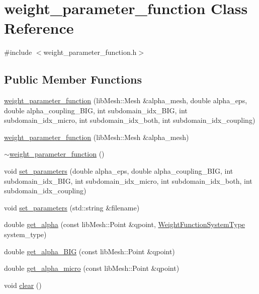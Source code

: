 \hypertarget{classweight__parameter__function}{}\section{weight\+\_\+parameter\+\_\+function Class Reference}
\label{classweight__parameter__function}


{\ttfamily \#include $<$weight\+\_\+parameter\+\_\+function.\+h$>$}

\subsection*{Public Member Functions}
\begin{DoxyCompactItemize}
\item 
\hyperlink{classweight__parameter__function_ae7dc955ca3080fc45818db02d57798ad}{weight\+\_\+parameter\+\_\+function} (lib\+Mesh\+::\+Mesh \&alpha\+\_\+mesh, double alpha\+\_\+eps, double alpha\+\_\+coupling\+\_\+\+B\+I\+G, int subdomain\+\_\+idx\+\_\+\+B\+I\+G, int subdomain\+\_\+idx\+\_\+micro, int subdomain\+\_\+idx\+\_\+both, int subdomain\+\_\+idx\+\_\+coupling)
\item 
\hyperlink{classweight__parameter__function_abf0209e5436906528b2ca90bcf9b025d}{weight\+\_\+parameter\+\_\+function} (lib\+Mesh\+::\+Mesh \&alpha\+\_\+mesh)
\item 
\hyperlink{classweight__parameter__function_a810022ef6bc2f4b5ca309f39c0eccce6}{$\sim$weight\+\_\+parameter\+\_\+function} ()
\item 
void \hyperlink{classweight__parameter__function_a63d24620e05e1a33a507986bac1a4c57}{set\+\_\+parameters} (double alpha\+\_\+eps, double alpha\+\_\+coupling\+\_\+\+B\+I\+G, int subdomain\+\_\+idx\+\_\+\+B\+I\+G, int subdomain\+\_\+idx\+\_\+micro, int subdomain\+\_\+idx\+\_\+both, int subdomain\+\_\+idx\+\_\+coupling)
\item 
void \hyperlink{classweight__parameter__function_ad421ad567700877e3dc27edb12f5c40e}{set\+\_\+parameters} (std\+::string \&filename)
\item 
double \hyperlink{classweight__parameter__function_a247727d50e3208790204e57a83c8bdc4}{get\+\_\+alpha} (const lib\+Mesh\+::\+Point \&qpoint, \hyperlink{ext__solver__libmesh__enums_8h_acc44f45992a493fb31c90d260d4ab83f}{Weight\+Function\+System\+Type} system\+\_\+type)
\item 
double \hyperlink{classweight__parameter__function_a44bddaa2910fa6dd2728ca476d2dd0bf}{get\+\_\+alpha\+\_\+\+B\+I\+G} (const lib\+Mesh\+::\+Point \&qpoint)
\item 
double \hyperlink{classweight__parameter__function_a3396f3bb6ec02247387f7eb9e6f440bc}{get\+\_\+alpha\+\_\+micro} (const lib\+Mesh\+::\+Point \&qpoint)
\item 
void \hyperlink{classweight__parameter__function_a99f8d52af0a1fa730b117352e6a5ee2b}{clear} ()
\end{DoxyCompactItemize}

